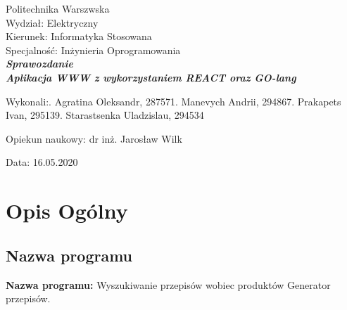 \documentclass[a4paper, 12pt]{article}
\newcommand{\mainmatter}{\clearpage \cfoot{\thepage\ of \pageref{LastPage}}
\pagenumbering{arabic}}
\begin{document}
	\begin{titlepage}
		
		\begin{center}
			\Large Politechnika Warszwska\\ 
			\Large Wydział: \large Elektryczny\\
			\Large Kierunek: \large Informatyka Stosowana\\
			\Large Specjalność:	 \large Inżynieria Oprogramowania\\
    	\vspace{5cm}
    		\Large\textit{\textbf{Sprawozdanie  
    		\\Aplikacja WWW z wykorzystaniem REACT oraz GO-lang}}\\ 
		\vspace{3cm}
		\end{center} 

		\hfill\begin{minipage}{0.65\textwidth}
			\Large Wykonali:. Agratina Oleksandr, 287571. Manevych Andrii, 294867. Prakapets Ivan, 295139. Starastsenka Uladzislau, 294534
		\vspace{\baselineskip}
		\end{minipage}
		
		
		\hfill\begin{minipage}{0.65\textwidth}
			\Large Opiekun naukowy:\newline
		 		dr inż. Jarosław Wilk
		\end{minipage}
		
		\hfill\begin{minipage}{0.5\textwidth}
		\vspace{1cm}
			\Large Data: 16.05.2020
			\vspace{\baselineskip}
		\end{minipage}

	\end{titlepage}
\newpage
\mainmatter
\setlength{\headheight}{15pt}
\doublespacing
\tableofcontents
\newpage

	\section{Opis Ogólny}
		\subsection{Nazwa programu} 
			\textbf{Nazwa programu:} Wyszukiwanie przepisów wobiec produktów Generator przepisów.\newline
			
\end{document}

